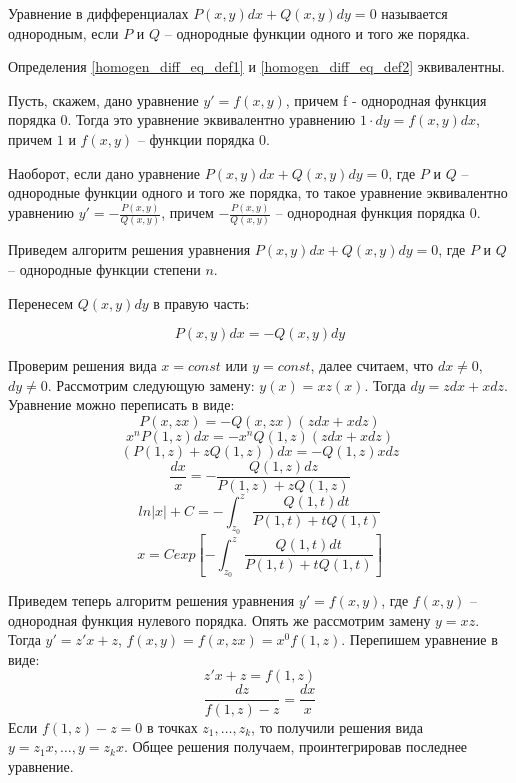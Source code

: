 \documentclass[document.tex]{subfiles}
\begin{document}
\begin{Definition}
\label{homogen_diff_eq_def2}
Уравнение в дифференциалах $P(x, y)dx + Q(x, y)dy = 0$ называется однородным, если $P$ и $Q$ -- однородные функции одного и того же порядка.
\end{Definition}
\begin{Statement}
Определения \ref{homogen_diff_eq_def1} и \ref{homogen_diff_eq_def2} эквивалентны.
\end{Statement}
\begin{Proof}
Пусть, скажем, дано уравнение $y' = f(x, y)$, причем f - однородная функция порядка 0. Тогда это уравнение эквивалентно уравнению $1 \cdot dy = f(x, y)dx$, причем $1$ и $f(x, y)$ -- функции порядка 0.

Наоборот, если дано уравнение $P(x, y)dx + Q(x, y)dy = 0$, где $P$ и $Q$ -- однородные функции одного и того же порядка, то такое уравнение эквивалентно уравнению $y' = -\frac{P(x, y)}{Q(x, y)}$, причем $-\frac{P(x, y)}{Q(x, y)}$ -- однородная функция порядка 0.
\end{Proof}
\begin{Remark}
Приведем алгоритм решения уравнения $P(x, y)dx + Q(x, y)dy = 0$, где $P$ и $Q$ -- однородные функции степени $n$.

Перенесем $Q(x, y)dy$ в правую часть:

$$P(x, y)dx = -Q(x, y)dy$$

Проверим решения вида $x = const$ или $y = const$, далее считаем, что $dx \neq 0$, $dy \neq 0$. Рассмотрим следующую замену: $y(x) = xz(x)$. Тогда $dy = zdx+xdz$. Уравнение можно переписать в виде:
$$P(x, zx) = -Q(x, zx)(zdx+xdz)$$
$$x^nP(1, z)dx = -x^nQ(1, z)(zdx+xdz)$$
$$(P(1, z)+zQ(1, z))dx = -Q(1, z)xdz$$
$$\frac{dx}{x} = -\frac{Q(1, z)dz}{P(1, z)+zQ(1, z)}$$
$$ln|x| + C = -\int^{z}_{z_0}\frac{Q(1, t)dt}{P(1, t)+tQ(1, t)}$$
$$x = Cexp\left[-\int^{z}_{z_0}\frac{Q(1, t)dt}{P(1, t)+tQ(1, t)}\right]$$

\end{Remark}
\begin{Remark}
Приведем теперь алгоритм решения уравнения $y' = f(x, y)$, где $f(x, y)$ -- однородная функция нулевого порядка. Опять же рассмотрим замену $y = xz$. Тогда $y' = z'x + z$, $f(x, y) = f(x, zx) = x^0f(1, z)$. Перепишем уравнение в виде:
$$z'x+z = f(1, z)$$
$$\frac{dz}{f(1,z)-z} = \frac{dx}{x}$$
Если $f(1, z) - z = 0$ в точках $z_1, \ldots, z_k$, то получили решения вида $y = z_1x, \ldots, y = z_kx$. Общее решения получаем, проинтегрировав последнее уравнение.
\end{Remark}
\end{document}
